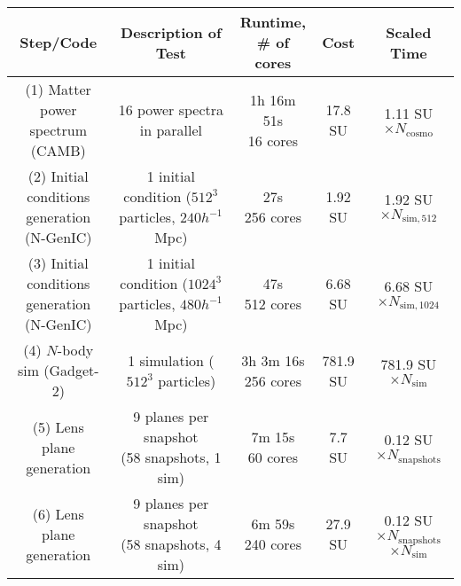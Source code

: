 \documentclass[10pt, preprint]{aastex}
\begin{document}
\begin{table}[t!] \label{tab:benchmarks}
\begin{center}
\begin{tabular}{|c|c|c|c|c|}
\hline
\textbf{Step/Code} & \textbf{Description of Test} & \pbox{20cm}{\textbf{Runtime,}\\ \textbf{\# of cores}} & \textbf{Cost} & \textbf{Scaled Time} \\ \hline \hline \hline\hline
\pbox{20cm}{(1) Matter power \\ spectrum (CAMB)} & \pbox{20cm}{16 power spectra \\ in parallel} & \pbox{20cm}{1h 16m 51s\\16 cores} & 17.8 SU & 1.11 SU $\times N_{\mathrm{cosmo}}$ \\ \hline 
\pbox{20cm}{(2) Initial conditions\\ generation (N-GenIC)\\} & \pbox{20cm}{1 initial condition \\ ($512^3$ particles,\\ $240 h^{-1}$ Mpc)} & \pbox{20cm}{27s\\256 cores} & 1.92 SU & 1.92 SU $\times N_{\mathrm{sim,512}}$ \\ \hline
\pbox{20cm}{(3) Initial conditions\\ generation (N-GenIC)\\} & \pbox{20cm}{1 initial condition \\ ($1024^3$ particles,\\ $480 h^{-1}$ Mpc)} & \pbox{20cm}{47s\\512 cores} & 6.68 SU & 6.68 SU $\times N_{\mathrm{sim,1024}}$ \\ \hline
\pbox{20cm}{(4) $N$-body sim\\ (Gadget-2)} & \pbox{20cm}{1 simulation \\ ($512^3$ particles)} & \pbox{20cm}{3h 3m 16s\\256 cores} & 781.9 SU & 781.9 SU $\times N_{\mathrm{sim}}$ \\ \hline \hline \hline \hline
\pbox{20cm}{(5) Lens plane\\ generation} & \pbox{20cm}{9 planes per snapshot\\ (58 snapshots, 1 sim)} & \pbox{20cm}{7m 15s\\60 cores} & 7.7 SU & 0.12 SU$\times N_{\mathrm{snapshots}}$ \\ \hline
\pbox{20cm}{(6) Lens plane\\ generation} & \pbox{20cm}{9 planes per snapshot\\ (58 snapshots, 4 sim)} & \pbox{20cm}{6m 59s\\240 cores} & 27.9 SU & \pbox{20cm}{0.12 SU$\times N_{\mathrm{snapshots}}$ \\ $\times N_{\mathrm{sim}}$} \\ \hline \hline

\end{tabular}
\end{center}
\end{table}
\end{document}
